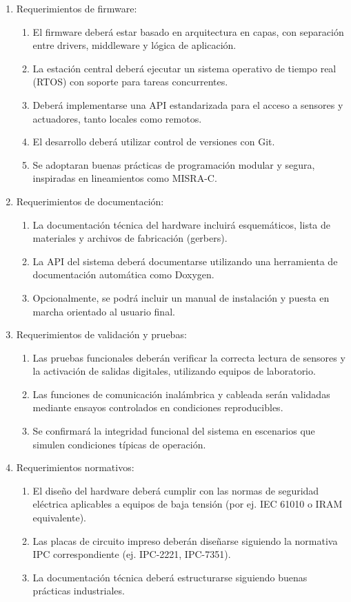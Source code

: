 \documentclass[
11pt, %
]{charter}
\begin{document}
\begin{enumerate}
	\item Requerimientos de firmware:
		\begin{enumerate}
			\item El firmware deberá estar basado en arquitectura en capas, con separación entre drivers, middleware y lógica de aplicación.
			\item La estación central deberá ejecutar un sistema operativo de tiempo real (RTOS) con soporte para tareas concurrentes.
			\item Deberá implementarse una API estandarizada para el acceso a sensores y actuadores, tanto locales como remotos.
			\item El desarrollo deberá utilizar control de versiones con Git.
			\item Se adoptaran buenas prácticas de programación modular y segura, inspiradas en lineamientos como MISRA-C.
		\end{enumerate}
		
	\item Requerimientos de documentación:
		\begin{enumerate}
			\item La documentación técnica del hardware incluirá esquemáticos, lista de materiales y archivos de fabricación (gerbers).
			\item La API del sistema deberá documentarse utilizando una herramienta de documentación automática como Doxygen.
			\item Opcionalmente, se podrá incluir un manual de instalación y puesta en marcha orientado al usuario final.
		\end{enumerate}
		
	\item Requerimientos de validación y pruebas:
		\begin{enumerate}
			\item Las pruebas funcionales deberán verificar la correcta lectura de sensores y la activación de salidas digitales, utilizando equipos de laboratorio.
			\item Las funciones de comunicación inalámbrica y cableada serán validadas mediante ensayos controlados en condiciones reproducibles.
			\item Se confirmará la integridad funcional del sistema en escenarios que simulen condiciones típicas de operación.
		\end{enumerate}
		
	\item Requerimientos normativos:
		\begin{enumerate}
			\item El diseño del hardware deberá cumplir con las normas de seguridad eléctrica aplicables a equipos de baja tensión (por ej. IEC 61010 o IRAM equivalente).
			\item Las placas de circuito impreso deberán diseñarse siguiendo la normativa IPC correspondiente (ej. IPC-2221, IPC-7351).
			\item La documentación técnica deberá estructurarse siguiendo buenas prácticas industriales.
		\end{enumerate}
		

\end{enumerate}
\end{document}
